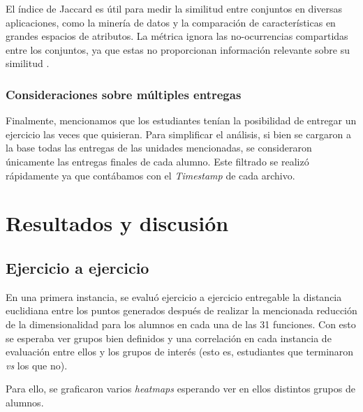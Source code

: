 \documentclass[11pt,a4paper,twoside,openany]{tesis}
\begin{document}
El índice de Jaccard es útil para medir la similitud entre conjuntos en diversas aplicaciones, como la minería de datos y la comparación de características en grandes espacios de atributos. La métrica ignora las no-ocurrencias compartidas entre los conjuntos, ya que estas no proporcionan información relevante sobre su similitud \cite{jaccard}.


\subsection{Consideraciones sobre múltiples entregas}

Finalmente, mencionamos que los estudiantes tenían la posibilidad de entregar un ejercicio las veces que quisieran. Para simplificar el análisis, si bien se cargaron a la base todas las entregas de las unidades mencionadas, se consideraron únicamente las entregas finales de cada alumno. Este filtrado se realizó rápidamente ya que contábamos con el \emph{Timestamp} de cada archivo.


\chapter{Resultados y discusión}
\section{Ejercicio a ejercicio}

En una primera instancia, se evaluó ejercicio a ejercicio entregable la distancia euclidiana entre los puntos generados después de realizar la mencionada reducción de la dimensionalidad para los alumnos en cada una de las 31 funciones. Con esto se esperaba ver grupos bien definidos y una correlación en cada instancia de evaluación entre ellos y los grupos de interés (esto es, estudiantes que terminaron \emph{vs} los que no). 

Para ello, se graficaron varios \emph{heatmaps} esperando ver en ellos distintos grupos de alumnos. 
\end{document}
